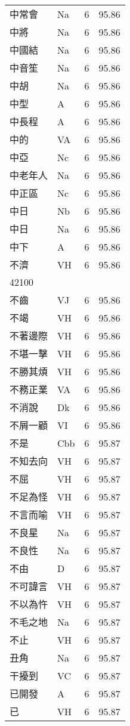 \documentclass[twocolumn]{book}
\begin{document}
\begin{supertabular}{llrr}
中常會 & Na & 6 &  95.86\\
中將 & Na & 6 &  95.86\\
中國結 & Na & 6 &  95.86\\
中音笙 & Na & 6 &  95.86\\
中胡 & Na & 6 &  95.86\\
中型 & A & 6 &  95.86\\
中長程 & A & 6 &  95.86\\
中的 & VA & 6 &  95.86\\
中亞 & Nc & 6 &  95.86\\
中老年人 & Na & 6 &  95.86\\
中正區 & Nc & 6 &  95.86\\
中日 & Nb & 6 &  95.86\\
中日 & Na & 6 &  95.86\\
中下 & A & 6 &  95.86\\
不濟 & VH & 6 &  95.86\\
42100\\
不齒 & VJ & 6 &  95.86\\
不竭 & VH & 6 &  95.86\\
不著邊際 & VH & 6 &  95.86\\
不堪一擊 & VH & 6 &  95.86\\
不勝其煩 & VH & 6 &  95.86\\
不務正業 & VA & 6 &  95.86\\
不消說 & Dk & 6 &  95.86\\
不屑一顧 & VI & 6 &  95.86\\
不是 & Cbb & 6 &  95.87\\
不知去向 & VH & 6 &  95.87\\
不屈 & VH & 6 &  95.87\\
不足為怪 & VH & 6 &  95.87\\
不言而喻 & VH & 6 &  95.87\\
不良星 & Na & 6 &  95.87\\
不良性 & Na & 6 &  95.87\\
不由 & D & 6 &  95.87\\
不可諱言 & VH & 6 &  95.87\\
不以為忤 & VH & 6 &  95.87\\
不毛之地 & Na & 6 &  95.87\\
不止 & VH & 6 &  95.87\\
丑角 & Na & 6 &  95.87\\
干擾到 & VC & 6 &  95.87\\
已開發 & A & 6 &  95.87\\
已 & VH & 6 &  95.87\\

\end{supertabular}
\end{document}
